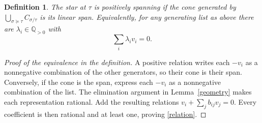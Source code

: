 \documentclass[11pt]{article}
\newtheorem{definition}[theorem]{Definition}
\newcommand{\Q}{\mathbb Q}
\begin{document}
\begin{definition}
The star at $\tau$ is positively spanning if the cone generated by $\bigcup_{\sigma\succeq\tau} C_{\sigma/\tau}$ is its linear span. Equivalently, for any generating list as above there are $\lambda_i\in\Q_{>0}$ with
\begin{equation}\label{relation}
 \sum_i\lambda_i v_i=0.
\end{equation}
\end{definition}
\begin{proof}[Proof of the equivalence in the definition]
A positive relation writes each $-v_i$ as a nonnegative combination of the other generators, so their cone is their span. Conversely, if the cone is the span, express each $-v_i$ as a nonnegative combination of the list. The elimination argument in Lemma~\ref{geometry} makes each representation rational. Add the resulting relations $v_i+\sum_j b_{ij}v_j=0$. Every coefficient is then rational and at least one, proving \eqref{relation}.
\end{proof}
\end{document}
